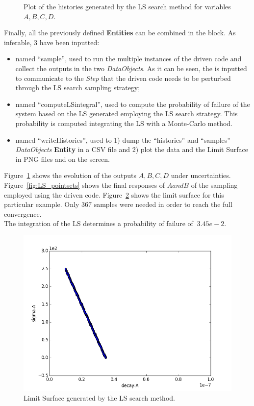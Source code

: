 \begin{enumerate}
\begin{figure}[h!]
  \caption{Plot of the histories generated by the LS search method for variables $A,B,C,D$.}
  \label{fig:LS_histories}
 \end{figure}
   Finally, all the previously defined \textbf{Entities} can be combined in 
   the  block. As inferable, 
   3  have been inputted:
   \begin{itemize}
     \item {} named ``sample'', used to run the multiple  
     instances of the driven code and 
     collect the outputs in the two \textit{DataObjects}. As it can be
     seen, the  is inputted to communicate to the 
     \textit{Step} that the driven code needs to
     be perturbed through the LS search sampling strategy;
     \item {} named ``computeLSintegral'', used to 
     compute the probability of failure of the system based on the LS generated employing the LS search strategy. This 
     probability is computed integrating the LS with a Monte-Carlo 
     method. 
     \item  {} named ``writeHistories'', used to 1) dump 
     the ``histories'' and ``samples''  \textit{DataObjects} 
     \textbf{Entity} in a CSV file and 2) plot the data and the Limit Surface 
     in  PNG files and on the screen.
   \end{itemize}
\end{enumerate} 
 Figure~\ref{fig:LS_histories} 
 shows the evolution of the outputs $A,B,C,D$ under uncertainties. 
 Figure~\ref{fig:LS_pointsets} shows the final responses  of $A and B$
 of the sampling employed using the driven code. 
 Figure~\ref{fig:LSplot}  shows the limit surface for this particular 
 example. Only $367$ samples were needed in order to reach the full 
 convergence.
 \\The integration of the LS determines a probability of failure of 
 $~3.45e-2$.
 \begin{figure}[h!]
  \centering
  \includegraphics[scale=0.7]{pics/LimitSurfacePlot.png}
  \caption{Limit Surface generated by the LS search method.}
  \label{fig:LSplot}
 \end{figure}








